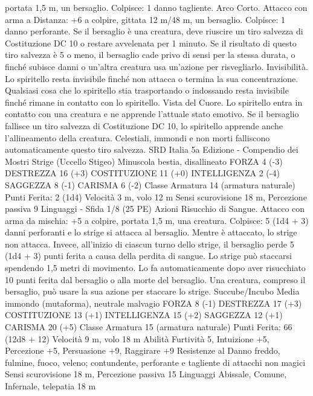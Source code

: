 \begin{multicols}{2}
portata 1,5 m, un bersaglio.
Colpisce: 1 danno tagliente.
Arco Corto. Attacco con arma a Distanza: +6 a colpire, gittata
12 m/48 m, un bersaglio.
Colpisce: 1 danno perforante. Se il bersaglio è una creatura, deve
riuscire un tiro salvezza di Costituzione DC 10 o restare
avvelenata per 1 minuto. Se il risultato di questo tiro salvezza è 5
o meno, il bersaglio cade privo di sensi per la stessa durata, o
finché subisce danni o un’altra creatura usa un’azione per
risvegliarlo.
Invisibilità. Lo spiritello resta invisibile finché non attacca o
termina la sua concentrazione. Qualsiasi cosa che lo spiritello
stia trasportando o indossando resta invisibile finché rimane in
contatto con lo spiritello.
Vista del Cuore. Lo spiritello entra in contatto con una creatura e
ne apprende l’attuale stato emotivo. Se il bersaglio fallisce un
tiro salvezza di Costituzione DC 10, lo spiritello apprende anche
l’allineamento della creatura. Celestiali, immondi e non morti
falliscono automaticamente questo tiro salvezza.
SRD Italia 5a Edizione - Compendio dei Mostri
Strige (Uccello Stigeo)
Minuscola bestia, disallineato
FORZA 4 (-3)
DESTREZZA 16 (+3)
COSTITUZIONE 11 (+0)
INTELLIGENZA 2 (-4)
SAGGEZZA 8 (-1)
CARISMA 6 (-2)
Classe Armatura 14 (armatura naturale)
\hspace*{0pt}\hfill{Punti Ferita}: 2 (1d4)
Velocità 3 m, volo 12 m
Sensi scurovisione 18 m, Percezione passiva 9
Linguaggi -
Sfida 1/8 (25 PE)
Azioni
Risucchio di Sangue. Attacco con arma da mischia: +5 a
colpire, portata 1,5 m, una creatura.
Colpisce: 5 (1d4 + 3) danni perforanti e lo strige si attacca al
bersaglio. Mentre è attaccato, lo strige non attacca. Invece,
all’inizio di ciascun turno dello strige, il bersaglio perde 5 (1d4 +
3) punti ferita a causa della perdita di sangue.
Lo strige può staccarsi spendendo 1,5 metri di movimento. Lo fa
automaticamente dopo aver risucchiato 10 punti ferita dal
bersaglio o alla morte del bersaglio. Una creatura, compreso il
bersaglio, può usare la sua azione per staccare lo strige.
Succube/Incubo
Media immondo (mutaforma), neutrale malvagio
FORZA 8 (-1)
DESTREZZA 17 (+3)
COSTITUZIONE 13 (+1)
INTELLIGENZA 15 (+2)
SAGGEZZA 12 (+1)
CARISMA 20 (+5)
Classe Armatura 15 (armatura naturale)
\hspace*{0pt}\hfill{Punti Ferita}: 66 (12d8 + 12)
Velocità 9 m, volo 18 m
Abilità Furtività 5, Intuizione +5, Percezione +5, Persuasione
+9, Raggirare +9
Resistenze al Danno freddo, fulmine, fuoco, veleno;
contundente, perforante e tagliente di attacchi non magici
Sensi scurovisione 18 m, Percezione passiva 15
Linguaggi Abissale, Comune, Infernale, telepatia 18 m

\end{multicols}
